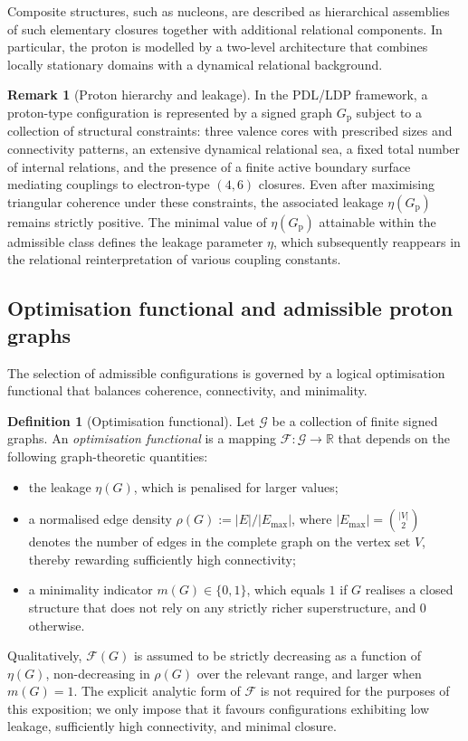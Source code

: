 \documentclass[11pt,a4paper]{article}
\theoremstyle{definition}
\newtheorem{definition}[theorem]{Definition}
\newtheorem{remark}[theorem]{Remark}
\newcommand{\etaL}{\eta} %
\newcommand{\Fopt}{\mathcal{F}} %
\begin{document}
Composite structures, such as nucleons, are described as hierarchical assemblies of such elementary closures together with additional relational components. In particular, the proton is modelled by a two-level architecture that combines locally stationary domains with a dynamical relational background.

\begin{remark}[Proton hierarchy and leakage]
In the PDL/LDP framework, a proton-type configuration is represented by a signed graph \(G_{\mathrm{p}}\) subject to a collection of structural constraints: three valence cores with prescribed sizes and connectivity patterns, an extensive dynamical relational sea, a fixed total number of internal relations, and the presence of a finite active boundary surface mediating couplings to electron-type \((4,6)\) closures. Even after maximising triangular coherence under these constraints, the associated leakage \(\eta(G_{\mathrm{p}})\) remains strictly positive. The minimal value of \(\eta(G_{\mathrm{p}})\) attainable within the admissible class defines the leakage parameter \(\etaL\), which subsequently reappears in the relational reinterpretation of various coupling constants.
\end{remark}

\subsection{Optimisation functional and admissible proton graphs}

The selection of admissible configurations is governed by a logical optimisation functional that balances coherence, connectivity, and minimality.

\begin{definition}[Optimisation functional]
Let \(\mathcal{G}\) be a collection of finite signed graphs. An \emph{optimisation functional} is a mapping \(\Fopt : \mathcal{G} \to \mathbb{R}\) that depends on the following graph-theoretic quantities:
\begin{itemize}
\item the leakage \(\eta(G)\), which is penalised for larger values;
\item a normalised edge density \(\rho(G) := |E| / |E_{\max}|\), where \(|E_{\max}| = \binom{|V|}{2}\) denotes the number of edges in the complete graph on the vertex set \(V\), thereby rewarding sufficiently high connectivity;
\item a minimality indicator \(m(G) \in \{0,1\}\), which equals \(1\) if \(G\) realises a closed structure that does not rely on any strictly richer superstructure, and \(0\) otherwise.
\end{itemize}
Qualitatively, \(\Fopt(G)\) is assumed to be strictly decreasing as a function of \(\eta(G)\), non-decreasing in \(\rho(G)\) over the relevant range, and larger when \(m(G)=1\). The explicit analytic form of \(\Fopt\) is not required for the purposes of this exposition; we only impose that it favours configurations exhibiting low leakage, sufficiently high connectivity, and minimal closure.
\end{definition}
\end{document}
